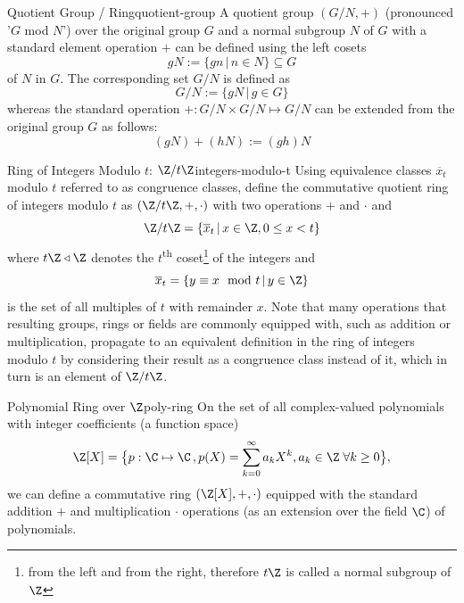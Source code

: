 \begin{definition}{Quotient Group / Ring}{quotient-group}
  A quotient group $(G / N, +)$ (pronounced '$G$ mod $N$') over the original group $G$ and a normal subgroup $N$ of $G$
  with a standard element operation $+$ can be defined using the left cosets
  $$gN := \{gn \,|\, n \in N\} \subseteq G$$ of $N$ in $G$.
  The corresponding set $G / N$ is defined as
  $$G / N := \{g N \,|\, g \in G\}$$
  whereas the standard operation $+: G/N \times G/N \mapsto G/N$
  can be extended from the original group $G$ as follows:
  $$(gN) + (hN) := (gh)N$$
\end{definition}

\begin{definition}{Ring of Integers Modulo $t$: $\Z / t \Z$}{integers-modulo-t}
  Using equivalence classes $\overline{x}_t$ modulo $t$ referred to as congruence classes,
  define the commutative quotient ring of integers modulo $t$ as $(\Z / t \Z, +, \cdot)$ with
  two operations $+$ and $\cdot$ and
  $$\Z / t \Z = \{\overline{x}_t \,|\, x \in \Z, 0 \leq x < t\}$$
  where $t \Z \triangleleft \Z$ denotes the $t$\textsuperscript{th} coset\footnote{
    from the left and from the right, therefore $t \Z$ is called a normal subgroup of $\Z$
  } of the integers and
  $$\overline{x}_t = \{y \equiv x \mod t \,|\, y \in \Z\}$$
  is the set of all multiples of $t$ with remainder $x$.
  Note that many operations that resulting groups, rings or fields are commonly equipped with,
  such as addition or multiplication, propagate to an equivalent definition in the ring of integers modulo $t$
  by considering their result as a congruence class instead of it, which in turn is an element of $\Z / t \Z$.
\end{definition}

\begin{definition}{Polynomial Ring over $\Z$}{poly-ring}
  On the set of all complex-valued polynomials with integer coefficients (a function space)
  $$\Z[X] = \big\{p: \C \mapsto \C \,, p(X) = \sum_{k=0}^\infty a_k X^k, a_k \in \Z \;\forall k \geq 0\big\},$$
  we can define a commutative ring $(\Z[X], +, \cdot)$ equipped with the
  standard addition $+$ and multiplication $\cdot$ operations (as an extension over the field $\C$)
  of polynomials.
\end{definition}

